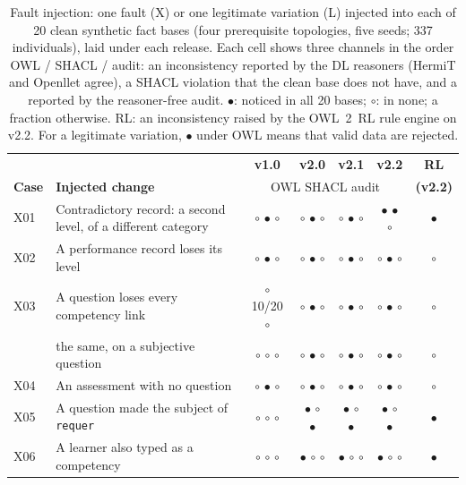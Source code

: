 \begin{table}[!t]
\caption{Fault injection: one fault (X) or one legitimate variation (L) injected into each of 20 clean synthetic fact bases (four prerequisite topologies, five seeds; 337 individuals), laid under each release. Each cell shows three channels in the order OWL / SHACL / audit: an inconsistency reported by the DL reasoners (HermiT and Openllet agree), a SHACL violation that the clean base does not have, and a  reported by the reasoner-free audit. $\bullet$: noticed in all 20 bases; $\circ$: in none; a fraction otherwise. RL: an inconsistency raised by the OWL~2~RL rule engine on v2.2. For a legitimate variation, $\bullet$ under OWL means that valid data are rejected.}
\label{tab:faults}
\centering
\footnotesize
\begin{tabular}{llccccc}
\hline
& & \textbf{v1.0} & \textbf{v2.0} & \textbf{v2.1} & \textbf{v2.2} & \textbf{RL} \\
\textbf{Case} & \textbf{Injected change} & \multicolumn{4}{c}{\footnotesize OWL\; SHACL\; audit} & \textbf{(v2.2)} \\
\hline
X01 & Contradictory record: a second level, of a different category & $\circ$ $\bullet$ $\circ$ & $\circ$ $\bullet$ $\circ$ & $\circ$ $\bullet$ $\circ$ & $\bullet$ $\bullet$ $\circ$ & $\bullet$ \\
X02 & A performance record loses its level & $\circ$ $\bullet$ $\circ$ & $\circ$ $\bullet$ $\circ$ & $\circ$ $\bullet$ $\circ$ & $\circ$ $\bullet$ $\circ$ & $\circ$ \\
X03 & A question loses every competency link & $\circ$ 10/20 $\circ$ & $\circ$ $\bullet$ $\circ$ & $\circ$ $\bullet$ $\circ$ & $\circ$ $\bullet$ $\circ$ & $\circ$ \\
 & \quad the same, on a subjective question & $\circ$ $\circ$ $\circ$ & $\circ$ $\bullet$ $\circ$ & $\circ$ $\bullet$ $\circ$ & $\circ$ $\bullet$ $\circ$ & $\circ$ \\
X04 & An assessment with no question & $\circ$ $\bullet$ $\circ$ & $\circ$ $\bullet$ $\circ$ & $\circ$ $\bullet$ $\circ$ & $\circ$ $\bullet$ $\circ$ & $\circ$ \\
X05 & A question made the subject of \texttt{requer} & $\circ$ $\circ$ $\circ$ & $\bullet$ $\circ$ $\bullet$ & $\bullet$ $\circ$ $\bullet$ & $\bullet$ $\circ$ $\bullet$ & $\bullet$ \\
X06 & A learner also typed as a competency & $\circ$ $\circ$ $\circ$ & $\bullet$ $\circ$ $\circ$ & $\bullet$ $\circ$ $\circ$ & $\bullet$ $\circ$ $\circ$ & $\bullet$ \\

\end{tabular}
\end{table}
